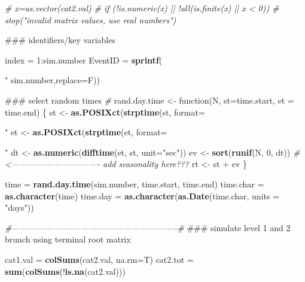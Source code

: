 \documentclass[]{article}
\newenvironment{Shaded}{\begin{snugshade}}{\end{snugshade}}
\newcommand{\KeywordTok}[1]{\textcolor[rgb]{0.13,0.29,0.53}{\textbf{{#1}}}}
\newcommand{\DataTypeTok}[1]{\textcolor[rgb]{0.13,0.29,0.53}{{#1}}}
\newcommand{\DecValTok}[1]{\textcolor[rgb]{0.00,0.00,0.81}{{#1}}}
\newcommand{\StringTok}[1]{\textcolor[rgb]{0.31,0.60,0.02}{{#1}}}
\newcommand{\CommentTok}[1]{\textcolor[rgb]{0.56,0.35,0.01}{\textit{{#1}}}}
\newcommand{\NormalTok}[1]{{#1}}
\begin{document}
\begin{Shaded}
\begin{Highlighting}[]
{{\CommentTok{#  x=as.vector(cat2.val)}
\CommentTok{#  if (!is.numeric(x) || !all(is.finite(x) || x < 0))}
\CommentTok{#    stop("invalid matrix values, use real numbers")}
    
\NormalTok{### identifiers/key variables}
  
  \NormalTok{index =}\StringTok{ }\DecValTok{1}\NormalTok{:sim.number }
  \NormalTok{EventID =}\StringTok{ }\KeywordTok{sprintf}\NormalTok{(}\StringTok{"%08d"}\NormalTok{, }\KeywordTok{sample}\NormalTok{(}\DecValTok{1}\NormalTok{:}\KeywordTok{paste}\NormalTok{(}\KeywordTok{rep}\NormalTok{(}\DecValTok{9}\NormalTok{,}\DecValTok{8}\NormalTok{), }\DataTypeTok{collapse=}\StringTok{""}\NormalTok{), }
                    \NormalTok{sim.number,}\DataTypeTok{replace=}\NormalTok{F))}
 
\NormalTok{### select random times}
\CommentTok{#}
\NormalTok{rand.day.time  <-}\StringTok{ }\NormalTok{function(N, }\DataTypeTok{st=}\NormalTok{time.start, }\DataTypeTok{et =} \NormalTok{time.end) \{}
    \NormalTok{st <-}\StringTok{ }\KeywordTok{as.POSIXct}\NormalTok{(}\KeywordTok{strptime}\NormalTok{(st, }\DataTypeTok{format=}\StringTok{"%Y/%m/%d %H:%M:%S"}\NormalTok{, }\DataTypeTok{tz=}\StringTok{"Pacific/Auckland"}\NormalTok{))}
    \NormalTok{et <-}\StringTok{ }\KeywordTok{as.POSIXct}\NormalTok{(}\KeywordTok{strptime}\NormalTok{(et, }\DataTypeTok{format=}\StringTok{"%Y/%m/%d %H:%M:%S"}\NormalTok{, }\DataTypeTok{tz=}\StringTok{"Pacific/Auckland"}\NormalTok{))}
    \NormalTok{dt <-}\StringTok{ }\KeywordTok{as.numeric}\NormalTok{(}\KeywordTok{difftime}\NormalTok{(et, st, }\DataTypeTok{unit=}\StringTok{"sec"}\NormalTok{))}
    \NormalTok{ev <-}\StringTok{ }\KeywordTok{sort}\NormalTok{(}\KeywordTok{runif}\NormalTok{(N, }\DecValTok{0}\NormalTok{, dt)) }\CommentTok{#<------------------------------- add seasonality here???}
    \NormalTok{rt <-}\StringTok{ }\NormalTok{st +}\StringTok{ }\NormalTok{ev}
\NormalTok{\}}

\NormalTok{time =}\StringTok{ }\KeywordTok{rand.day.time}\NormalTok{(sim.number, time.start, time.end)}
\NormalTok{time.char =}\StringTok{ }\KeywordTok{as.character}\NormalTok{(time)}
\NormalTok{time.day =}\StringTok{ }\KeywordTok{as.character}\NormalTok{(}\KeywordTok{as.Date}\NormalTok{(time.char, }\DataTypeTok{units =} \StringTok{"days"}\NormalTok{))}

\CommentTok{#----------------------------------------------------------#}
\NormalTok{### simulate level 1 and 2 brunch using terminal root matrix}

\NormalTok{cat1.val =}\StringTok{ }\KeywordTok{colSums}\NormalTok{(cat2.val, }\DataTypeTok{na.rm=}\NormalTok{T)}
\NormalTok{cat2.tot =}\StringTok{ }\KeywordTok{sum}\NormalTok{(}\KeywordTok{colSums}\NormalTok{(!}\KeywordTok{is.na}\NormalTok{(cat2.val)))}

}}}}}
\end{Highlighting}
\end{Shaded}
\end{document}
